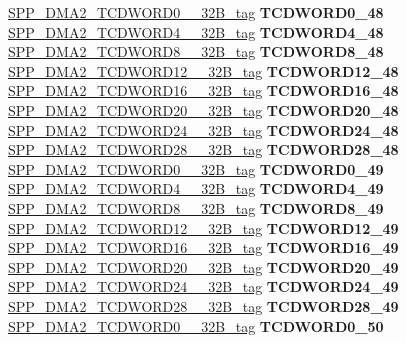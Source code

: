 \begin{DoxyCompactItemize}
\begin{tabbing}
\>\>\mbox{\hyperlink{unionSPP__DMA2__TCDWORD0____32B__tag}{SPP\_DMA2\_TCDWORD0\_\_32B\_tag}} {\bfseries TCDWORD0\_48}\\
\>\>\mbox{\hyperlink{unionSPP__DMA2__TCDWORD4____32B__tag}{SPP\_DMA2\_TCDWORD4\_\_32B\_tag}} {\bfseries TCDWORD4\_48}\\
\>\>\mbox{\hyperlink{unionSPP__DMA2__TCDWORD8____32B__tag}{SPP\_DMA2\_TCDWORD8\_\_32B\_tag}} {\bfseries TCDWORD8\_48}\\
\>\>\mbox{\hyperlink{unionSPP__DMA2__TCDWORD12____32B__tag}{SPP\_DMA2\_TCDWORD12\_\_32B\_tag}} {\bfseries TCDWORD12\_48}\\
\>\>\mbox{\hyperlink{unionSPP__DMA2__TCDWORD16____32B__tag}{SPP\_DMA2\_TCDWORD16\_\_32B\_tag}} {\bfseries TCDWORD16\_48}\\
\>\>\mbox{\hyperlink{unionSPP__DMA2__TCDWORD20____32B__tag}{SPP\_DMA2\_TCDWORD20\_\_32B\_tag}} {\bfseries TCDWORD20\_48}\\
\>\>\mbox{\hyperlink{unionSPP__DMA2__TCDWORD24____32B__tag}{SPP\_DMA2\_TCDWORD24\_\_32B\_tag}} {\bfseries TCDWORD24\_48}\\
\>\>\mbox{\hyperlink{unionSPP__DMA2__TCDWORD28____32B__tag}{SPP\_DMA2\_TCDWORD28\_\_32B\_tag}} {\bfseries TCDWORD28\_48}\\
\>\>\mbox{\hyperlink{unionSPP__DMA2__TCDWORD0____32B__tag}{SPP\_DMA2\_TCDWORD0\_\_32B\_tag}} {\bfseries TCDWORD0\_49}\\
\>\>\mbox{\hyperlink{unionSPP__DMA2__TCDWORD4____32B__tag}{SPP\_DMA2\_TCDWORD4\_\_32B\_tag}} {\bfseries TCDWORD4\_49}\\
\>\>\mbox{\hyperlink{unionSPP__DMA2__TCDWORD8____32B__tag}{SPP\_DMA2\_TCDWORD8\_\_32B\_tag}} {\bfseries TCDWORD8\_49}\\
\>\>\mbox{\hyperlink{unionSPP__DMA2__TCDWORD12____32B__tag}{SPP\_DMA2\_TCDWORD12\_\_32B\_tag}} {\bfseries TCDWORD12\_49}\\
\>\>\mbox{\hyperlink{unionSPP__DMA2__TCDWORD16____32B__tag}{SPP\_DMA2\_TCDWORD16\_\_32B\_tag}} {\bfseries TCDWORD16\_49}\\
\>\>\mbox{\hyperlink{unionSPP__DMA2__TCDWORD20____32B__tag}{SPP\_DMA2\_TCDWORD20\_\_32B\_tag}} {\bfseries TCDWORD20\_49}\\
\>\>\mbox{\hyperlink{unionSPP__DMA2__TCDWORD24____32B__tag}{SPP\_DMA2\_TCDWORD24\_\_32B\_tag}} {\bfseries TCDWORD24\_49}\\
\>\>\mbox{\hyperlink{unionSPP__DMA2__TCDWORD28____32B__tag}{SPP\_DMA2\_TCDWORD28\_\_32B\_tag}} {\bfseries TCDWORD28\_49}\\
\>\>\mbox{\hyperlink{unionSPP__DMA2__TCDWORD0____32B__tag}{SPP\_DMA2\_TCDWORD0\_\_32B\_tag}} {\bfseries TCDWORD0\_50}\\

\end{tabbing}
\end{DoxyCompactItemize}
